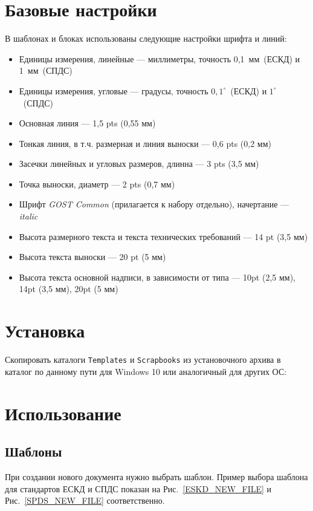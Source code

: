 \documentclass[14pt]{extreport}
\begin{document}
\section{Базовые настройки}
В шаблонах и блоках использованы следующие настройки шрифта и линий:
\begin{itemize}
	\item Единицы измерения, линейные --- миллиметры, точность 0,1~мм~(ЕСКД) и 1~мм~(СПДС)
	\item Единицы измерения, угловые --- градусы, точность $0,1^\circ$~(ЕСКД) и $1^\circ$~(СПДС)
	\item Основная линия --- 1,5 pts (0,55 мм)
	\item Тонкая линия, в т.ч. размерная и линия выноски --- 0,6 pts (0,2 мм)
	\item Засечки линейных и угловых размеров, длинна --- 3 pts (3,5 мм)
	\item Точка выноски, диаметр --- 2 pts (0,7 мм)
	\item Шрифт \textit{GOST Common} (прилагается к набору отдельно), начертание --- \textit{italic}
	\item Высота размерного текста и текста технических требований --- 14 pt (3,5 мм)
	\item Высота текста выноски --- 20 pt (5 мм)
	\item Высота текста основной надписи, в зависимости от типа --- 10pt (2,5 мм), 14pt (3,5 мм), 20pt (5 мм)
\end{itemize}

\section{Установка}
Скопировать каталоги \texttt{Templates} и \texttt{Scrapbooks} из установочного архива в каталог по данному пути для Windows 10 или аналогичный для других ОС:\\

\noindent
{\small {}}

\section{Использование}
\subsection{Шаблоны}
При создании нового документа нужно выбрать шаблон. Пример выбора шаблона для стандартов ЕСКД и СПДС показан на Рис.~\ref{ESKD_NEW_FILE} и Рис.~\ref{SPDS_NEW_FILE} соответственно.
\end{document}
